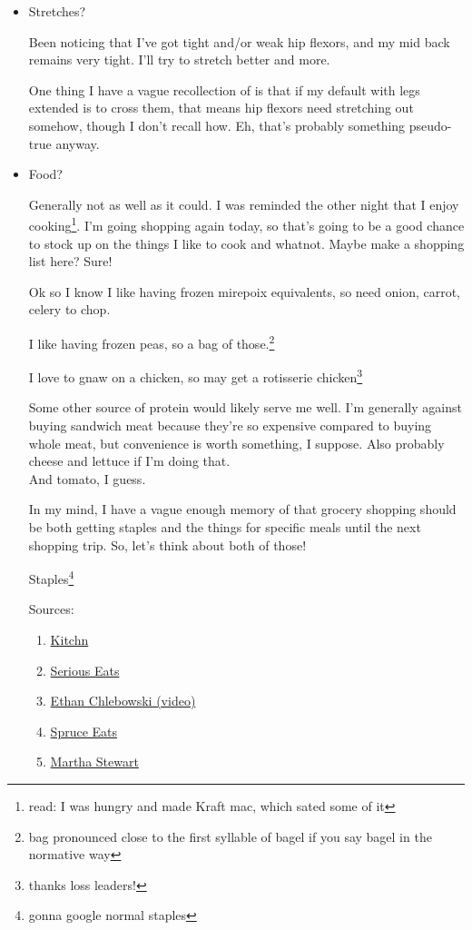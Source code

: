 \documentclass[12pt]{article}
\renewcommand{\,}{\textsuperscript{,}}
\begin{document}
\begin{itemize}
\begin{itemize}
Eh, we'll see how the day goes.

\item Stretches?

Been noticing that I've got tight and/or weak hip flexors, and my mid back remains very tight. I'll try to stretch better and more.

One thing I have a vague recollection of is that if my default with legs extended is to cross them, that means hip flexors need stretching out somehow, though I don't recall how.  
Eh, that's probably something pseudo-true anyway.

\item Food?

Generally not as well as it could. I was reminded the other night that I enjoy cooking\footnote{read: I was hungry and made Kraft mac, which sated some of it}.  
I'm going shopping again today, so that's going to be a good chance to stock up on the things I like to cook and whatnot.  
Maybe make a shopping list here?  
Sure!

Ok so I know I like having frozen mirepoix equivalents, so need onion, carrot, celery to chop.

I like having frozen peas, so a bag of those.\footnote{bag pronounced close to the first syllable of bagel if you say bagel in the normative way}

I love to gnaw on a chicken, so may get a rotisserie chicken\footnote{thanks loss leaders!}

Some other source of protein would likely serve me well.  
I'm generally against buying sandwich meat because they're so expensive compared to buying whole meat, but convenience is worth something, I suppose.  
Also probably cheese and lettuce if I'm doing that.\\  
And tomato, I guess.

In my mind, I have a vague enough memory of that grocery shopping should be both getting staples and the things for specific meals until the next shopping trip.  
So, let's think about both of those!

Staples\footnote{gonna google normal staples}

Sources:  
\begin{enumerate}  
\item \href{https://www.thekitchn.com/pantry-staples-2-23747192}{Kitchn}  
\item \href{https://www.seriouseats.com/pantry-guides-5181287}{Serious Eats}  
\item \href{https://www.youtube.com/watch?v=ylh9GnBYhfc}{Ethan Chlebowski (video)}  
\item \href{https://www.thespruceeats.com/standard-kitchen-supplies-for-your-pantry-1808020}{Spruce Eats}  
\item \href{https://www.marthastewart.com/1112123/your-grocery-list-perfect-pantry-and-how-keep-it-perpetually-stocked}{Martha Stewart}  
\end{enumerate}


\end{itemize}
\end{itemize}
\end{document}
